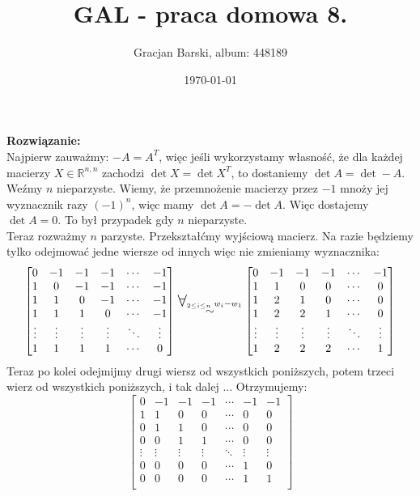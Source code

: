 \documentclass[11pt]{article}
\title{GAL - praca domowa 8.}
\author{Gracjan Barski, album: 448189}
\date{\today}
\newcommand{\R}{\mathbb{R}}
\newcommand{\Forall}{{\Large\mbox{$\forall$}}}
\begin{document}
\maketitle
\textbf{Rozwiązanie:} \\[10pt]
Najpierw zauważmy: $-A = A^T$, więc jeśli wykorzystamy własność, że dla każdej macierzy $X \in \R^{n,n}$ zachodzi $\det X = \det X^T$, to dostaniemy $\det A = \det -A$. Weźmy $n$ nieparzyste. Wiemy, że przemnożenie macierzy przez $-1$ mnoży jej wyznacznik razy $(-1)^n$, więc mamy $\det A = - \det A$. Więc dostajemy $\det A = 0$. To był przypadek gdy $n$ nieparzyste. \\[10pt]
Teraz rozważmy $n$ parzyste. Przekształćmy wyjściową macierz. Na razie będziemy tylko odejmować jedne wiersze od innych więc nie zmieniamy wyznacznika:
$$
\begin{bmatrix}
0 & -1 & -1 & -1 & \cdots & -1 \\
1 & 0 & -1 & -1 & \cdots & -1 \\
1 & 1 & 0 & -1 & \cdots & -1 \\
1 & 1 & 1 & 0 & \cdots & -1 \\
\vdots & \vdots & \vdots & \vdots & \ddots & \vdots \\
1 & 1 & 1 & 1 & \cdots & 0 \\
\end{bmatrix} 
\overset{\Forall_{2 \leq i \leq n} \; w_i - w_1}{\sim}
\begin{bmatrix}
0 & -1 & -1 & -1 & \cdots & -1 \\
1 & 1 & 0 & 0 & \cdots & 0 \\
1 & 2 & 1 & 0 & \cdots & 0 \\
1 & 2 & 2 & 1 & \cdots & 0 \\
\vdots & \vdots & \vdots & \vdots & \ddots & \vdots \\
1 & 2 & 2 & 2 & \cdots & 1 \\
\end{bmatrix}
$$
Teraz po kolei odejmijmy drugi wiersz od wszystkich poniższych, potem trzeci wierz od wszystkich poniższych, i tak dalej $\ldots$ Otrzymujemy:
$$
\begin{bmatrix}
0 & -1 & -1 & -1 & \cdots & -1 & -1\\
1 & 1 & 0 & 0 & \cdots & 0 & 0\\
0 & 1 & 1 & 0 & \cdots & 0 & 0\\
0 & 0 & 1 & 1 & \cdots & 0 & 0\\
\vdots & \vdots & \vdots & \vdots & \ddots & \vdots & \vdots \\
0 & 0 & 0 & 0 & \cdots & 1 & 0 \\
0 & 0 & 0 & 0 & \cdots & 1 & 1 \\
\end{bmatrix}
$$
\end{document}
